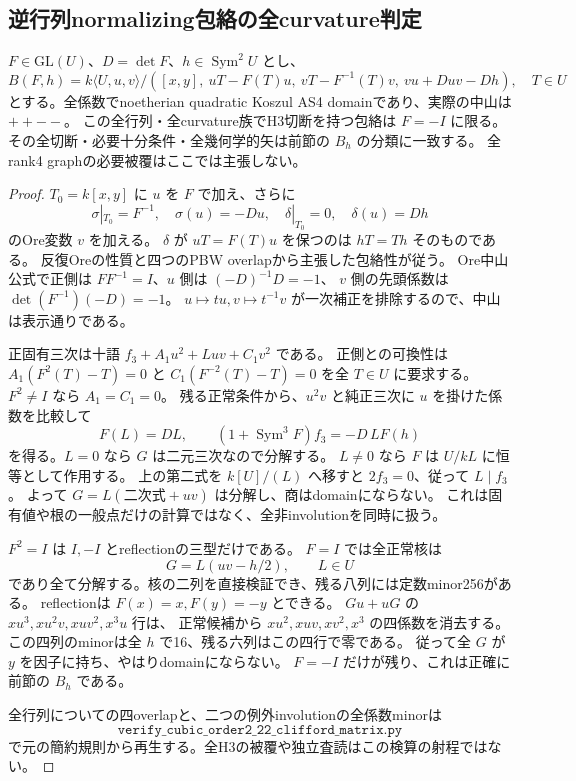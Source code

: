 \subsection{逆行列normalizing包絡の全curvature判定}
\label{subsec:h3-order2-22-clifford-matrix}
\begin{theorem}\label{thm:h3-order2-22-clifford-matrix}
$F\in\mathrm{GL}(U)$、$D=\det F$、$h\in\operatorname{Sym}^2U$ とし、
\[
 B(F,h)=k\langle U,u,v\rangle/
 ([x,y],\ uT-F(T)u,\ vT-F^{-1}(T)v,\ vu+Duv-Dh),\quad T\in U
\]
とする。全係数でnoetherian quadratic Koszul AS4 domainであり、実際の中山は $++--$。
この全行列・全curvature族でH3切断を持つ包絡は $F=-I$ に限る。
その全切断・必要十分条件・全幾何学的矢は前節の $B_h$ の分類に一致する。
全rank4 graphの必要被覆はここでは主張しない。
\end{theorem}
\begin{proof}
$T_0=k[x,y]$ に $u$ を $F$ で加え、さらに
\[
 \sigma|_{T_0}=F^{-1},\quad \sigma(u)=-Du,\quad
 \delta|_{T_0}=0,\quad\delta(u)=Dh
\]
のOre変数 $v$ を加える。
$\delta$ が $uT=F(T)u$ を保つのは $hT=Th$ そのものである。
反復Oreの性質と四つのPBW overlapから主張した包絡性が従う。
Ore中山公式で正側は $F F^{-1}=I$、$u$ 側は $(-D)^{-1}D=-1$、
$v$ 側の先頭係数は $\det(F^{-1})(-D)=-1$。
$u\mapsto tu,v\mapsto t^{-1}v$ が一次補正を排除するので、中山は表示通りである。

正固有三次は十語 $f_3+A_1u^2+Luv+C_1v^2$ である。
正側との可換性は $A_1(F^2(T)-T)=0$ と
$C_1(F^{-2}(T)-T)=0$ を全 $T\in U$ に要求する。
$F^2\ne I$ なら $A_1=C_1=0$。
残る正常条件から、$u^2v$ と純正三次に $u$ を掛けた係数を比較して
\[
 F(L)=DL,\qquad (1+\operatorname{Sym}^3F)f_3=-D\,L F(h)
\]
を得る。$L=0$ なら $G$ は二元三次なので分解する。
$L\ne0$ なら $F$ は $U/kL$ に恒等として作用する。
上の第二式を $k[U]/(L)$ へ移すと $2f_3=0$、従って $L\mid f_3$。
よって $G=L(\text{二次式}+uv)$ は分解し、商はdomainにならない。
これは固有値や根の一般点だけの計算ではなく、全非involutionを同時に扱う。

$F^2=I$ は $I,-I$ とreflectionの三型だけである。
$F=I$ では全正常核は
\[
 G=L(uv-h/2),\qquad L\in U
\]
であり全て分解する。核の二列を直接検証でき、残る八列には定数minor256がある。
reflectionは $F(x)=x,F(y)=-y$ とできる。
$Gu+uG$ の $xu^3,xu^2v,xuv^2,x^3u$ 行は、
正常候補から $xu^2,xuv,xv^2,x^3$ の四係数を消去する。
この四列のminorは全 $h$ で16、残る六列はこの四行で零である。
従って全 $G$ が $y$ を因子に持ち、やはりdomainにならない。
$F=-I$ だけが残り、これは正確に前節の $B_h$ である。

全行列についての四overlapと、二つの例外involutionの全係数minorは
\[
\texttt{verify\_cubic\_order2\_22\_clifford\_matrix.py}
\]
で元の簡約規則から再生する。全H3の被覆や独立査読はこの検算の射程ではない。
\end{proof}
